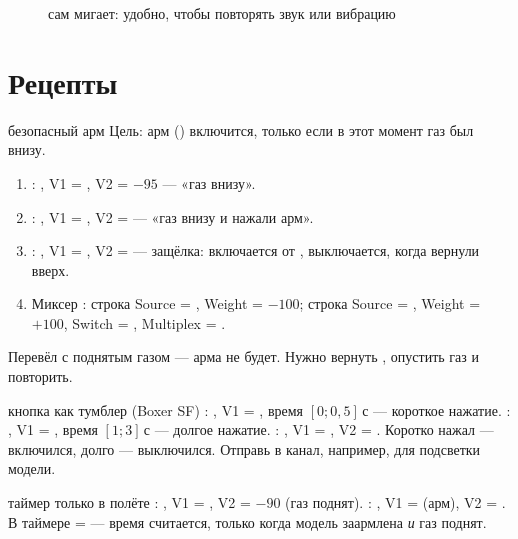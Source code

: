\begin{figure}[H]
\centering
{}
\caption{ сам мигает: удобно, чтобы повторять звук или вибрацию}
\end{figure}

\section{Рецепты}

\begin{recipe}{безопасный арм}
Цель: арм () включится, только если в этот момент газ был внизу.
\begin{enumerate}
  \item {}: , V1 = , V2 = $-95$ --- «газ внизу».
  \item {}: , V1 = , V2 =  --- «газ внизу и нажали арм».
  \item {}: , V1 = , V2 =  --- защёлка: включается от ,
        выключается, когда  вернули вверх.
  \item Миксер : строка Source = , Weight = $-100$; строка Source = ,
        Weight = $+100$, Switch = , Multiplex = .
\end{enumerate}
Перевёл  с поднятым газом --- арма не будет. Нужно вернуть , опустить газ и повторить.
\end{recipe}

\begin{recipe}{кнопка как тумблер (Boxer SF)}
: , V1 = , время $[0; 0{,}5]$\,с --- короткое нажатие.
: , V1 = , время $[1; 3]$\,с --- долгое нажатие.
: , V1 = , V2 = .
Коротко нажал ---  включился, долго --- выключился. Отправь  в канал, например, для
подсветки модели.
\end{recipe}

\begin{recipe}{таймер только в полёте}
: , V1 = , V2 = $-90$ (газ поднят).
: , V1 =  (арм), V2 = .
В таймере  =  --- время считается, только когда модель заармлена \emph{и}
газ поднят.
\end{recipe}


